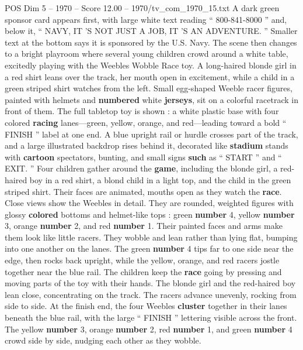 \begin{textsample}{POS Dim 5 – 1970 – Score 12.00 – 1970/tv\_com\_1970\_15.txt}  \label{ex:f5_pos_081}
A dark green sponsor card appears first, with large white text reading “ 800-841-8000 ” and, below it, “ NAVY, IT ’S NOT JUST A JOB, IT ’S AN ADVENTURE. ” Smaller text at the bottom says it is sponsored by the U.S.
Navy.
The scene then changes to a bright playroom where several young children crowd around a white table, excitedly playing with the Weebles Wobble Race toy.
A long-haired blonde girl in a red shirt leans over the track, her mouth open in excitement, while a child in a green striped shirt watches from the left.
Small egg-shaped Weeble racer figures, painted with helmets and \textbf{numbered} white \textbf{jerseys}, sit on a colorful racetrack in front of them.
The full tabletop toy is shown : a white plastic base with four colored \textbf{racing} lanes—green, yellow, orange, and red—leading toward a bold “ FINISH ” label at one end.
A blue upright rail or hurdle crosses part of the track, and a large illustrated backdrop rises behind it, decorated like \textbf{stadium} stands with \textbf{cartoon} spectators, bunting, and small signs \textbf{such} as “ START ” and “ EXIT. ” Four children gather around the \textbf{game}, including the blonde girl, a red-haired boy in a red shirt, a blond child in a light top, and the child in the green striped shirt.
Their faces are animated, mouths open as they watch the \textbf{race}.
Close views show the Weebles in detail.
They are rounded, weighted figures with glossy \textbf{colored} bottoms and helmet-like tops : green \textbf{number} 4, yellow \textbf{number} 3, orange \textbf{number} 2, and red \textbf{number} 1.
Their painted faces and arms make them look like little racers.
They wobble and lean rather than lying flat, bumping into one another on the lanes.
The green \textbf{number} 4 tips far to one side near the edge, then rocks back upright, while the yellow, orange, and red racers jostle together near the blue rail.
The children keep the \textbf{race} going by pressing and moving parts of the toy with their hands.
The blonde girl and the red-haired boy lean close, concentrating on the track.
The racers advance unevenly, rocking from side to side.
At the finish end, the four Weebles \textbf{cluster} together in their lanes beneath the blue rail, with the large “ FINISH ” lettering visible across the front.
The yellow \textbf{number} 3, orange \textbf{number} 2, red \textbf{number} 1, and green \textbf{number} 4 crowd side by side, nudging each other as they wobble.

\end{textsample}
